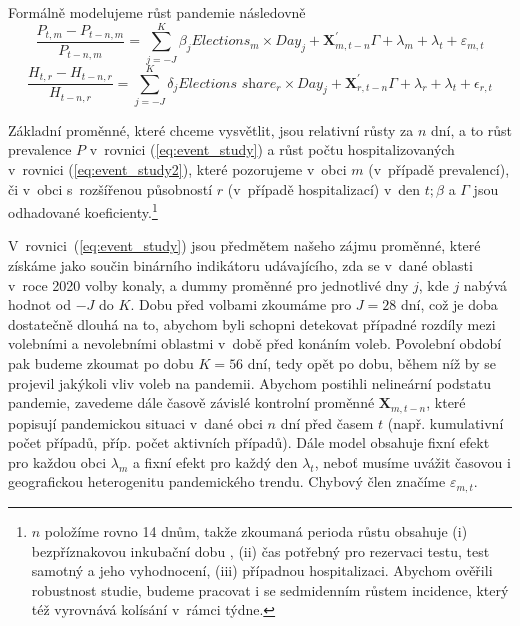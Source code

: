 Formálně modelujeme růst pandemie následovně
\begin{equation}
\label{eq:event_study}
\frac{P_{t,m} - P_{t-n,m}}{P_{t-n,m}} = \sum_{j=-J}^{K} \beta_j \textit{Elections}_m \times Day_j + \textbf{X}_{m,t-n}^{'}\Gamma + \lambda_{m} + \lambda_{t} + \varepsilon_{m,t}
\end{equation}
\begin{equation}
\label{eq:event_study2}
\frac{H_{t,r} - H_{t-n,r}}{H_{t-n,r}} = \sum_{j=-J}^{K} \delta_j \textit{Elections share}_r \times Day_j + \textbf{X}_{r,t-n}^{'}\Gamma + \lambda_{r} + \lambda_{t} + \epsilon_{r,t}
\end{equation}

Základní proměnné, které chceme vysvětlit, jsou relativní růsty za $n$ dní, a to růst prevalence $P$ v~rovnici (\ref{eq:event_study}) a růst počtu hospitalizovaných v~rovnici (\ref{eq:event_study2}), které pozorujeme v~obci $m$ (v~případě prevalencí), či v~obci s~rozšířenou působností $r$ (v~případě hospitalizací) v~den $t; \beta$ a $\Gamma$ jsou odhadované koeficienty.\footnote{$n$ položíme rovno 14 dnům, takže zkoumaná perioda růstu obsahuje
(i) bezpříznakovou inkubační dobu \cite{lauer_et_al2020}, (ii) čas potřebný pro rezervaci testu, test samotný a jeho vyhodnocení, (iii) případnou hospitalizaci. Abychom ověřili robustnost studie, budeme pracovat i se sedmidenním růstem incidence, který též vyrovnává kolísání v~rámci týdne.}


V~rovnici~(\ref{eq:event_study}) jsou předmětem našeho zájmu proměnné, které získáme jako součin binárního indikátoru udávajícího, zda se v~dané oblasti v~roce 2020 volby konaly, a dummy proměnné pro jednotlivé dny $j$, kde $j$ nabývá hodnot od $-J$ do $K$. 
Dobu před volbami zkoumáme pro $J=28$ dní, což je doba dostatečně dlouhá na to, abychom byli schopni detekovat případné rozdíly mezi volebními a nevolebními oblastmi v~době před konáním voleb. Povolební období pak budeme zkoumat po dobu $K=56$ dní, tedy opět po dobu, během níž by se projevil jakýkoli vliv voleb na pandemii. Abychom postihli nelineární podstatu pandemie, zavedeme dále časově závislé kontrolní proměnné $\textbf{X}_{m,t-n}$, které popisují pandemickou situaci v~dané obci $n$ dní před časem $t$ (např. kumulativní počet případů, příp. počet aktivních případů). Dále model obsahuje fixní efekt pro každou obci $\lambda_{m}$ a fixní efekt pro každý den $\lambda_{t}$, neboť musíme uvážit časovou i geografickou heterogenitu pandemického trendu. Chybový člen značíme
 $\varepsilon_{m,t}$.

